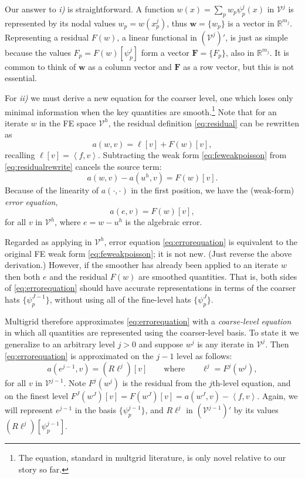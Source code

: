 \documentclass[letterpaper,final,12pt,reqno]{amsart}
\theoremstyle{claim}
\newcommand{\RR}{\mathbb{R}}
\newcommand{\bw}{\mathbf{w}}
\newcommand{\bF}{\mathbf{F}}
\newcommand{\ip}[2]{\left<#1,#2\right>}
\numberwithin{equation}{section}
\numberwithin{figure}{section}
\numberwithin{table}{section}
\numberwithin{theorem}{section}
\begin{document}
Our answer to \emph{i)} is straightforward.  A function $w(x) = \sum_p w_p \psi_p^j(x)$ in $\mathcal{V}^j$ is represented by its nodal values $w_p=w(x_p^j)$, thus $\bw = \{w_p\}$ is a vector in $\RR^{m_j}$.  Representing a residual $F(w)$, a linear functional in $(\mathcal{V}^j)'$, is just as simple because the values $F_p = F(w)[\psi_p^j]$ form a vector $\bF=\{F_p\}$, also in $\RR^{m_j}$.  It is common to think of $\bw$ as a column vector and $\bF$ as a row vector, but this is not essential.

For \emph{ii)} we must derive a new equation for the coarser level, one which loses only minimal information when the key quantities are smooth.\footnote{The equation, standard in multgrid literature, is only novel relative to our story so far.}  Note that for an iterate $w$ in the FE space $\mathcal{V}^h$, the residual definition \eqref{eq:residual} can be rewritten as
\begin{equation}
  a(w,v) = \ell[v] + F(w)[v],  \label{eq:residualrewrite}
\end{equation}
recalling $\ell[v] = \ip{f}{v}$.  Subtracting the weak form \eqref{eq:feweakpoisson} from \eqref{eq:residualrewrite} cancels the source term:
\begin{equation}
  a(w,v) - a(u^h,v) = F(w)[v].  \label{eq:errorequationearly}
\end{equation}
Because of the linearity of $a(\cdot,\cdot)$ in the first position, we have the (weak-form) \emph{error equation},
\begin{equation}
  a(e,v) = F(w)[v],  \label{eq:errorequation}
\end{equation}
for all $v$ in $\mathcal{V}^h$, where $e=w-u^h$ is the algebraic error.

Regarded as applying in $\mathcal{V}^h$, error equation \eqref{eq:errorequation} is equivalent to the original FE weak form \eqref{eq:feweakpoisson}; it is not new.  (Just reverse the above derivation.)  However, if the smoother has already been applied to an iterate $w$ then both $e$ and the residual $F(w)$ are smoothed quantities.  That is, both sides of \eqref{eq:errorequation} should have accurate representations in terms of the coarser hats $\{\psi_p^{J-1}\}$, without using all of the fine-level hats $\{\psi_p^{J}\}$.

Multigrid therefore approximates \eqref{eq:errorequation} with a \emph{coarse-level equation} in which all quantities are represented using the coarser-level basis.  To state it we generalize to an arbitrary level $j>0$ and suppose $w^j$ is any iterate in $\mathcal{V}^j$.  Then \eqref{eq:errorequation} is approximated on the $j-1$ level as follows:
\begin{equation}
  a(e^{j-1},v) = (R\ell^j)[v] \qquad \text{where} \qquad \ell^j = F^j(w^j),  \label{eq:coarsecorrection}
\end{equation}
for all $v$ in $\mathcal{V}^{j-1}$.  Note $F^j(w^j)$ is the residual from the $j$th-level equation, and on the finest level $F^J(w^J)[v] = F(w^J)[v] = a(w^J,v) - \ip{f}{v}$.  Again, we will represent $e^{j-1}$ in the basis $\{\psi_p^{j-1}\}$, and $R\ell^j$  in $(\mathcal{V}^{j-1})'$ by its values $(R\ell^j)[\psi_p^{j-1}]$.
\end{document}
